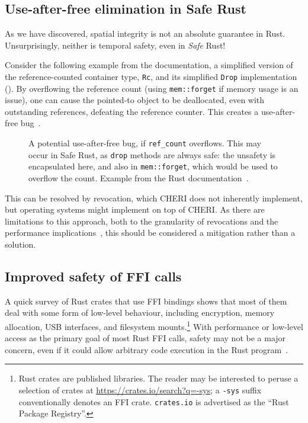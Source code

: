 \documentclass[dissertation.tex]{subfiles}
\begin{document}
\subsection{Use-after-free elimination in Safe Rust}
\label{sec:eval-rust-use-after-free}

As we have discovered, spatial integrity is not an absolute guarantee in
Rust.
Unsurprisingly, neither is temporal safety, even in \emph{Safe} Rust!

Consider the following example from the documentation, a simplified
version of the reference-counted container type, \texttt{Rc}, and its
simplified \texttt{Drop} implementation ().
By overflowing the reference count (using \texttt{mem::forget} if memory
usage is an issue), one can cause the pointed-to object to be
deallocated, even with outstanding references, defeating the reference
counter.
This creates a use-after-free bug~\cite{rust-nomicon-rc-leak}.

\begin{figure}[ht]
    
    \caption{
        A potential use-after-free bug, if \texttt{ref\_count}
        overflows.
        This may occur in Safe Rust, as \texttt{drop} methods are always
        safe: the unsafety is encapsulated here, and also in
        \texttt{mem::forget}, which would be used to overflow the count.
        Example from the Rust documentation~\cite{rust-nomicon-rc-leak}.
    }
    \label{lst:eval-rust-rc-drop}
\end{figure}

This can be resolved by revocation, which CHERI does not inherently
implement, but operating systems might implement on top of CHERI.
As there are limitations to this approach, both to the granularity of
revocations and the performance implications~\cite{cheri-v6}, this
should be considered a mitigation rather than a solution.


\subsection{Improved safety of FFI calls}
\label{sec:eval-rust-xprocess}

A quick survey of Rust crates that use FFI bindings shows that most of
them deal with some form of low-level behaviour, including encryption,
memory allocation, USB interfaces, and filesystem mounts.\footnote{
    Rust crates are published libraries.
    The reader may be interested to peruse a selection of crates at
    \url{https://crates.io/search?q=-sys};
    a \texttt{-sys} suffix conventionally denotes an FFI crate.
    \texttt{crates.io} is advertised as the ``Rust Package Registry''.
}
With performance or low-level access as the primary goal of most Rust
FFI calls, safety may not be a major concern, even if it could allow
arbitrary code execution in the Rust
program~\cite{szekeres-eternal-war}.
\end{document}
